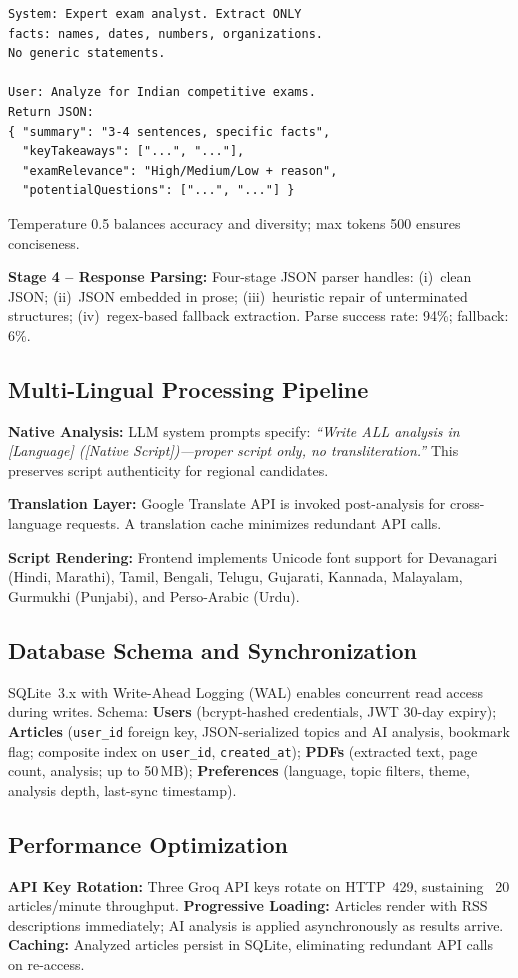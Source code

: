 \documentclass[conference]{IEEEtran}
\begin{document}
\begin{verbatim}
System: Expert exam analyst. Extract ONLY
facts: names, dates, numbers, organizations.
No generic statements.

User: Analyze for Indian competitive exams.
Return JSON:
{ "summary": "3-4 sentences, specific facts",
  "keyTakeaways": ["...", "..."],
  "examRelevance": "High/Medium/Low + reason",
  "potentialQuestions": ["...", "..."] }
\end{verbatim}

Temperature 0.5 balances accuracy and diversity; max tokens 500 ensures conciseness.

\textbf{Stage 4 – Response Parsing:} Four-stage JSON parser handles: (i)~clean JSON; (ii)~JSON embedded in prose; (iii)~heuristic repair of unterminated structures; (iv)~regex-based fallback extraction. Parse success rate: 94\%; fallback: 6\%.

\subsection{Multi-Lingual Processing Pipeline}
\textbf{Native Analysis:} LLM system prompts specify: \textit{``Write ALL analysis in [Language] ([Native Script])—proper script only, no transliteration.''} This preserves script authenticity for regional candidates.

\textbf{Translation Layer:} Google Translate API is invoked post-analysis for cross-language requests. A translation cache minimizes redundant API calls.

\textbf{Script Rendering:} Frontend implements Unicode font support for Devanagari (Hindi, Marathi), Tamil, Bengali, Telugu, Gujarati, Kannada, Malayalam, Gurmukhi (Punjabi), and Perso-Arabic (Urdu).

\subsection{Database Schema and Synchronization}
SQLite~3.x with Write-Ahead Logging (WAL) enables concurrent read access during writes. Schema: \textbf{Users} (bcrypt-hashed credentials, JWT 30-day expiry); \textbf{Articles} (\texttt{user\_id} foreign key, JSON-serialized topics and AI analysis, bookmark flag; composite index on \texttt{user\_id}, \texttt{created\_at}); \textbf{PDFs} (extracted text, page count, analysis; up to 50\,MB); \textbf{Preferences} (language, topic filters, theme, analysis depth, last-sync timestamp).

\subsection{Performance Optimization}
\textbf{API Key Rotation:} Three Groq API keys rotate on HTTP~429, sustaining ~20 articles/minute throughput. \textbf{Progressive Loading:} Articles render with RSS descriptions immediately; AI analysis is applied asynchronously as results arrive. \textbf{Caching:} Analyzed articles persist in SQLite, eliminating redundant API calls on re-access.
\end{document}
